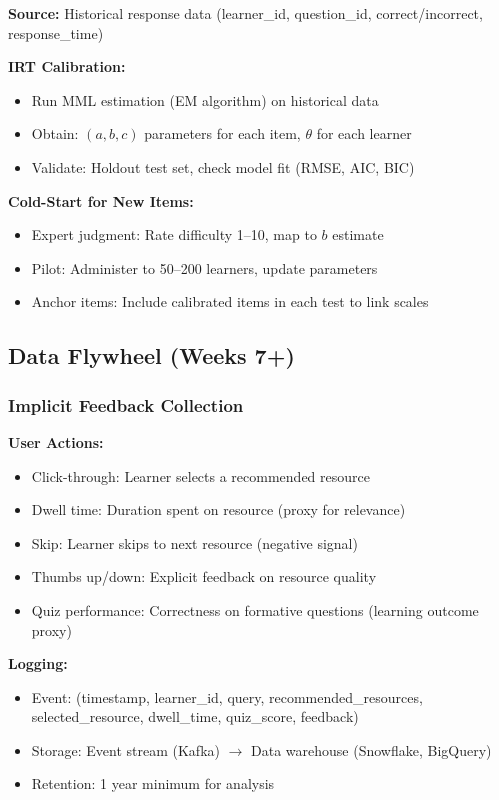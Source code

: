 \documentclass[11pt,letterpaper]{article}
\begin{document}
\textbf{Source:} Historical response data (learner\_id, question\_id, correct/incorrect, response\_time)

\textbf{IRT Calibration:}
\begin{itemize}
\item Run MML estimation (EM algorithm) on historical data
\item Obtain: $(a, b, c)$ parameters for each item, $\theta$ for each learner
\item Validate: Holdout test set, check model fit (RMSE, AIC, BIC)
\end{itemize}

\textbf{Cold-Start for New Items:}
\begin{itemize}
\item Expert judgment: Rate difficulty 1--10, map to $b$ estimate
\item Pilot: Administer to 50--200 learners, update parameters
\item Anchor items: Include calibrated items in each test to link scales
\end{itemize}

\subsection{Data Flywheel (Weeks 7+)}\label{subsec:data-flywheel}

\subsubsection{Implicit Feedback Collection}\label{subsubsec:implicit-feedback}

\textbf{User Actions:}
\begin{itemize}
\item Click-through: Learner selects a recommended resource
\item Dwell time: Duration spent on resource (proxy for relevance)
\item Skip: Learner skips to next resource (negative signal)
\item Thumbs up/down: Explicit feedback on resource quality
\item Quiz performance: Correctness on formative questions (learning outcome proxy)
\end{itemize}

\textbf{Logging:}
\begin{itemize}
\item Event: (timestamp, learner\_id, query, recommended\_resources, selected\_resource, dwell\_time, quiz\_score, feedback)
\item Storage: Event stream (Kafka) $\rightarrow$ Data warehouse (Snowflake, BigQuery)
\item Retention: 1 year minimum for analysis
\end{itemize}
\end{document}
